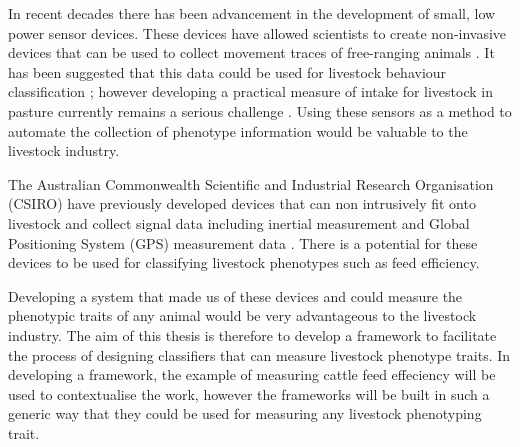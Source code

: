 In recent decades there has been advancement in the development of small, low power sensor devices. These devices have allowed scientists to create non-invasive devices that can be used to collect movement traces of free-ranging animals \cite{Anthony2012}. It has been suggested that this data could be used for livestock behaviour classification \cite{Guo2006}; however developing a practical measure of intake for livestock in pasture currently remains a serious challenge \cite{Cottle2013}. Using these sensors as a method to automate the collection of phenotype information would be valuable to the livestock industry. 

The Australian Commonwealth Scientific and Industrial Research Organisation (CSIRO) have previously developed devices that can non intrusively fit onto livestock and collect signal data including inertial measurement and Global Positioning System (GPS) measurement data \cite{Guo2006}. There is a potential for these devices to be used for classifying livestock phenotypes such as feed efficiency.

Developing a system that made us of these devices and could measure the phenotypic traits of any animal would be very advantageous to the livestock industry. The aim of this thesis is therefore to develop a framework to facilitate the process of designing classifiers that can measure livestock phenotype traits. In developing a framework, the example of measuring cattle feed effeciency will be used to contextualise the work, however the frameworks will be built in such a generic way that they could be used for measuring any livestock phenotyping trait. 
